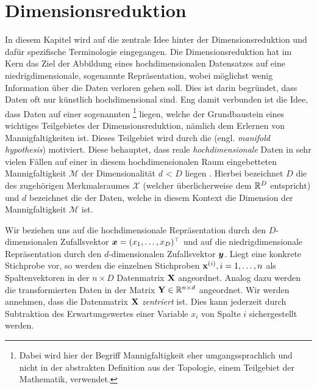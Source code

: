 \chapter{Dimensionsreduktion}
\label{ch:Dimensionsreduktion}

In diesem Kapitel wird auf die zentrale Idee hinter der Dimensionsreduktion und dafür spezifische
Terminologie eingegangen. Die Dimensionsreduktion hat im Kern das Ziel der Abbildung eines
hochdimensionalen Datensatzes auf eine niedrigdimensionale, sogenannte 
Repräsentation, wobei möglichst wenig Information über die Daten verloren gehen soll. Dies ist
darin begründet, dass Daten oft nur künstlich hochdimensional sind. Eng damit verbunden ist die
Idee, dass Daten auf einer sogenannten \footnote{Dabei wird hier der
	Begriff Mannigfaltigkeit eher umgangssprachlich und nicht in der abstrakten Definition aus der
	Topologie, einem Teilgebiet der Mathematik, verwendet.} liegen, welche der Grundbaustein eines
wichtiges Teilgebietes der Dimensionsreduktion, nämlich dem Erlernen von Mannigfaltigkeiten \parencite{Cayton.2005} ist. Dieses Teilgebiet wird durch die 
(engl. \textit{manifold hypothesis}) motiviert. Diese behauptet, dass reale
\textit{hochdimensionale} Daten in sehr vielen Fällen auf einer in diesem hochdimensionalen Raum
eingebetteten Mannigfaltigkeit $\mathcal{M}$ der Dimensionalität $d$ < $D$ liegen \parencite[vgl.][1]{Cayton.2005}.  Hierbei
bezeichnet $D$ die  des zugehörigen Merkmalsraumes $\mathcal{X}$
(welcher überlicherweise dem $\mathbb{R}^D$ entspricht) und $d$ bezeichnet die  der Daten, welche in diesem Kontext die Dimension der Mannigfaltigkeit $\mathcal{M}$
ist.

Wir beziehen uns auf die hochdimensionale Repräsentation durch den $D$-dimensionalen Zufallsvektor
$\bm{x} = (x_1, \ldots, x_D)^\top$ und auf die niedrigdimensionale Repräsentation
durch den $d$-dimensionalen Zufallsvektor $\bm{y}$. Liegt eine konkrete Stichprobe vor, so
werden die einzelnen Stichproben $\mathbf{x}^{(i)}, i = 1,\ldots,n$ als Spaltenvektoren in der $n
	\times D$ Datenmatrix $\mathbf{X}$ angeordnet. Analog dazu werden die transformierten Daten in der
Matrix $\mathbf{Y} \in \mathbb{R}^{n \times d}$ angeordnet. Wir werden annehmen, dass die Datenmatrix
$\mathbf{X}$ \textit{zentriert} ist. Dies kann jederzeit durch Subtraktion des Erwartungswertes einer
Variable $x_i$ von Spalte $i$ sichergestellt werden.

